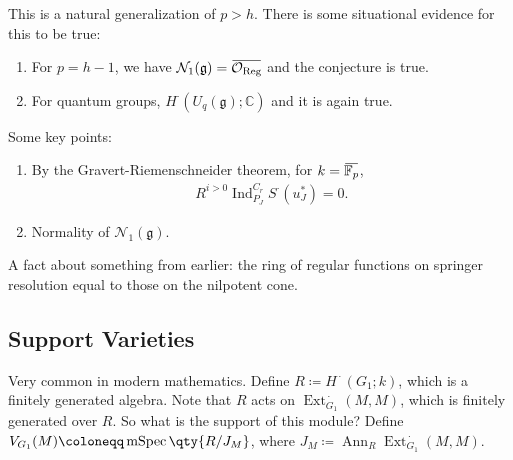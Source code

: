 \begin{remark}

This is a natural generalization of \(p>h\). There is some situational
evidence for this to be true:

\begin{enumerate}
\def\labelenumi{\arabic{enumi}.}
\tightlist
\item
  For \(p=h-1\), we have
  \(\mathcal{N}_1({\mathfrak{g}}) = \mkern 1.5mu\overline{\mkern-1.5mu{\mathcal{O}}_{\operatorname{Reg}}\mkern-1.5mu}\mkern 1.5mu\)
  and the conjecture is true.
\item
  For quantum groups, \(H^\cdot(U_q({\mathfrak{g}}); {\mathbb{C}})\) and
  it is again true.
\end{enumerate}


\end{remark}

\begin{remark}

Some key points:

\begin{enumerate}
\def\labelenumi{\arabic{enumi}.}
\item
  By the Gravert-Riemenschneider theorem, for
  \(k= \mkern 1.5mu\overline{\mkern-1.5mu{\mathbb{F}}_p\mkern-1.5mu}\mkern 1.5mu\),
  \begin{align*}  
  R^{i>0} \operatorname{Ind}_{P_J}^{C_r} S^\cdot(u_J^*) = 0
  .\end{align*}
\item
  Normality of \(\mathcal{N}_1({\mathfrak{g}})\).
\end{enumerate}

A fact about something from earlier: the ring of regular functions on
springer resolution equal to those on the nilpotent cone.

\end{remark}

\hypertarget{support-varieties}{%
\subsection{Support Varieties}\label{support-varieties}}

Very common in modern mathematics. Define
\(R \coloneqq H^{\,\cdot\,}(G_1; k)\), which is a finitely generated
algebra. Note that \(R\) acts on
\(\operatorname{Ext}_{G_1}^{\,\cdot\,}(M, M)\), which is finitely
generated over \(R\). So what is the support of this module? Define
\(V_{G_1}(M) \coloneqq\operatorname{mSpec}\qty{R/J_M}\), where
\(J_M \coloneqq\operatorname{Ann}_R \operatorname{Ext}_{G_1}^{\,\cdot\,}(M, M)\).


